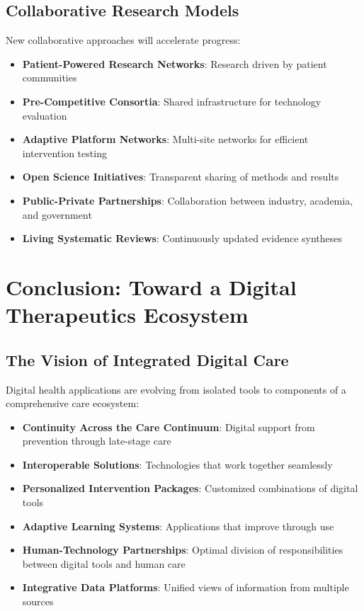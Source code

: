 \subsection{Collaborative Research Models}
New collaborative approaches will accelerate progress:

\begin{itemize}
    \item \textbf{Patient-Powered Research Networks}: Research driven by patient communities
    
    \item \textbf{Pre-Competitive Consortia}: Shared infrastructure for technology evaluation
    
    \item \textbf{Adaptive Platform Networks}: Multi-site networks for efficient intervention testing
    
    \item \textbf{Open Science Initiatives}: Transparent sharing of methods and results
    
    \item \textbf{Public-Private Partnerships}: Collaboration between industry, academia, and government
    
    \item \textbf{Living Systematic Reviews}: Continuously updated evidence syntheses
\end{itemize}

\section{Conclusion: Toward a Digital Therapeutics Ecosystem}
\subsection{The Vision of Integrated Digital Care}
Digital health applications are evolving from isolated tools to components of a comprehensive care ecosystem:

\begin{itemize}
    \item \textbf{Continuity Across the Care Continuum}: Digital support from prevention through late-stage care
    
    \item \textbf{Interoperable Solutions}: Technologies that work together seamlessly
    
    \item \textbf{Personalized Intervention Packages}: Customized combinations of digital tools
    
    \item \textbf{Adaptive Learning Systems}: Applications that improve through use
    
    \item \textbf{Human-Technology Partnerships}: Optimal division of responsibilities between digital tools and human care
    
    \item \textbf{Integrative Data Platforms}: Unified views of information from multiple sources
\end{itemize}

